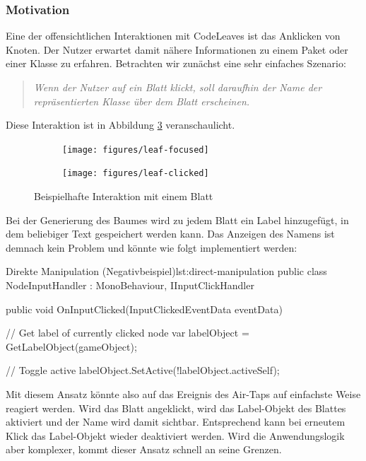 \subsubsection*{Motivation}
Eine der offensichtlichen Interaktionen mit CodeLeaves ist das Anklicken von Knoten. Der Nutzer erwartet damit nähere Informationen zu einem Paket oder einer Klasse zu erfahren. Betrachten wir zunächst eine sehr einfaches Szenario:

\begin{quotation}
  \textit{Wenn der Nutzer auf ein Blatt klickt, soll daraufhin der Name der repräsentierten Klasse über dem Blatt erscheinen.}
\end{quotation}

Diese Interaktion ist in Abbildung \ref{fig:leaf-interaction} veranschaulicht.

\setlength{\fwidth}{.49\textwidth}
\begin{figure}[htb]
  \centering
  \begin{subfigure}[b]{\fwidth}
   \texttt{[image: figures/leaf-focused]}
    \label{fig:leaf-focused}
  \end{subfigure}
  \hfill
  \begin{subfigure}[b]{\fwidth}
  	\texttt{[image: figures/leaf-clicked]}
  	 \label{fig:leaf-clicked}
  \end{subfigure}
  \caption{Beispielhafte Interaktion mit einem Blatt} \label{fig:leaf-interaction}
\end{figure}

Bei der Generierung des Baumes wird zu jedem Blatt ein Label hinzugefügt, in dem beliebiger Text gespeichert werden kann. Das Anzeigen des Namens ist demnach kein Problem und könnte wie folgt implementiert werden:

\begin{codesnippet}{Direkte Manipulation (Negativbeispiel)}{lst:direct-manipulation}
public class NodeInputHandler : MonoBehaviour, IInputClickHandler
{
    public void OnInputClicked(InputClickedEventData eventData)
    {
        // Get label of currently clicked node
        var labelObject = GetLabelObject(gameObject);

        // Toggle active
        labelObject.SetActive(!labelObject.activeSelf);
    }
}
\end{codesnippet}

Mit diesem Ansatz könnte also auf das Ereignis des Air-Taps auf einfachste Weise reagiert werden. Wird das Blatt angeklickt, wird das Label-Objekt des Blattes aktiviert und der Name wird damit sichtbar. Entsprechend kann bei erneutem Klick das Label-Objekt wieder deaktiviert werden. Wird die Anwendungslogik aber komplexer, kommt dieser Ansatz schnell an seine Grenzen.

